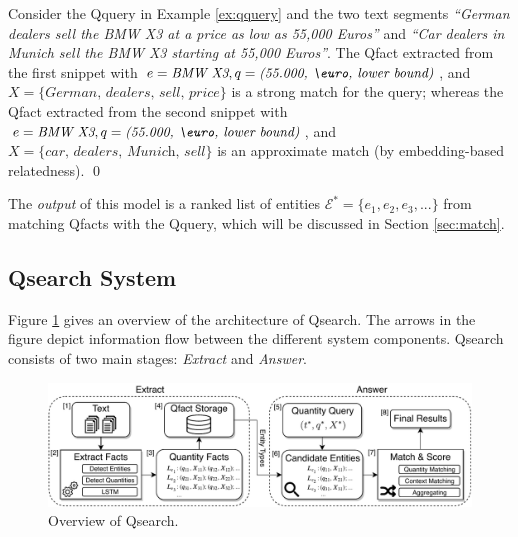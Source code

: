 \begin{example}
Consider the Qquery in Example \ref{ex:qquery} and the two text segments
 \textit{``German dealers sell the BMW X3
 at a price as low as 55,000 Euros''} and
 \textit{``Car dealers in Munich sell the BMW X3
starting at 55,000 Euros''}.
The Qfact extracted from the first snippet
with 
$e=\textit{BMW X3},
q=\textit{(55.000, \euro, lower bound)}$,
and $X = \{\textit{German, dealers, sell, price}\}$
is a strong match for the query;
whereas the Qfact extracted from the second snippet
with 
$e = \textit{BMW X3},
q=\textit{(55.000, \euro, lower bound)}$,
and $X = \{\textit{car, dealers, Munich, sell}\}$
is an approximate match (by embedding-based relatedness).
\qed 
\end{example}

The \textit{output} of this model is a ranked list of entities $\mathcal{E}^* = \{e_1, e_2, e_3,...\}$ from matching Qfacts with the Qquery, which will be discussed in Section \ref{sec:match}.


\subsection{Qsearch System}
Figure \ref{fig:system} 
gives an overview of the architecture of 
Qsearch. The arrows in the figure depict information flow between the different system components. 
Qsearch consists of two main stages:
\textit{Extract}
and \textit{Answer}.
 

\begin{figure}[t]
\centering
\includegraphics[width=1\textwidth]{figures/overview.pdf}
\caption{Overview of Qsearch.}
\label{fig:system}
\end{figure}

